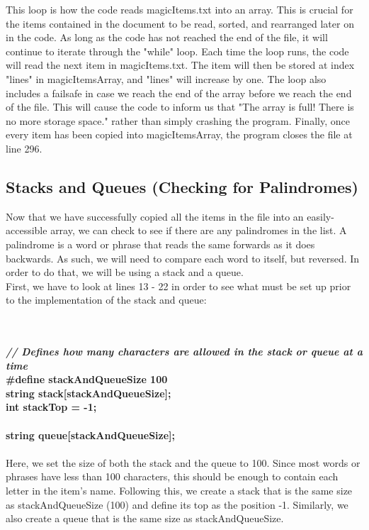 \documentclass{article}
\begin{document}
This loop is how the code reads magicItems.txt into an array. This is crucial for the items contained in the document to be read, sorted, and rearranged later on in the code. As long as the code has not reached the end of the file, it will continue to iterate through the "while" loop. Each time the loop runs, the code will read the next item in magicItems.txt. The item will then be stored at index "lines" in magicItemsArray, and "lines" will increase by one. The loop also includes a failsafe in case we reach the end of the array before we reach the end of the file. This will cause the code to inform us that "The array is full! There is no more storage space." rather than simply crashing the program. Finally, once every item has been copied into magicItemsArray, the program closes the file at line 296.

\subsection{Stacks and Queues (Checking for Palindromes)}
Now that we have successfully copied all the items in the file into an easily-accessible array, we can check to see if there are any palindromes in the list. A palindrome is a word or phrase that reads the same forwards as it does backwards. As such, we will need to compare each word to itself, but reversed. In order to do that, we will be using a stack and a queue. \\

First, we have to look at lines 13 - 22 in order to see what must be set up prior to the implementation of the stack and queue:

\textbf{
\\~\\ \textit{ // Defines how many characters are allowed in the stack or queue at a time\\ }
\#define stackAndQueueSize 100\\
string stack[stackAndQueueSize];\\
int stackTop = -1;\\
\\
string queue[stackAndQueueSize];\\ }
\\ 
Here, we set the size of both the stack and the queue to 100. Since most words or phrases have less than 100 characters, this should be enough to contain each letter in the item's name. Following this, we create a stack that is the same size as stackAndQueueSize (100) and define its top as the position -1. Similarly, we also create a queue that is the same size as stackAndQueueSize.\\
\end{document}
